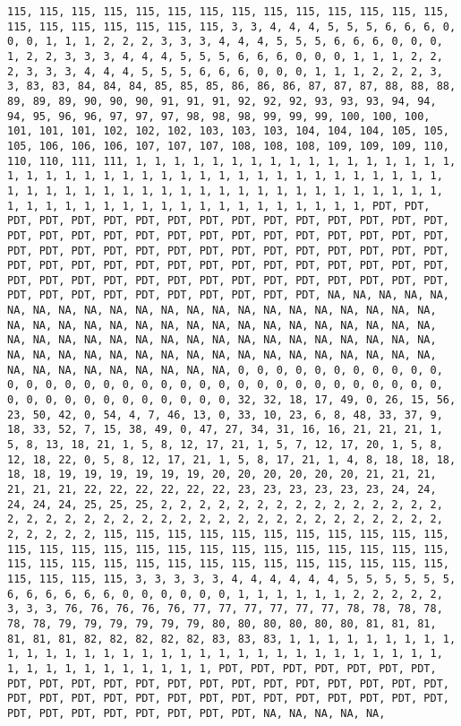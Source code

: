 \documentclass[]{article}
\begin{document}
\begin{verbatim}
115, 115, 115, 115, 115, 115, 115, 115, 115, 115, 115, 115, 115, 115, 115, 115, 115, 115, 115, 115, 115, 3, 3, 4, 4, 4, 5, 5, 5, 6, 6, 6, 0, 0, 0, 1, 1, 1, 2, 2, 2, 3, 3, 3, 4, 4, 4, 5, 5, 5, 6, 6, 6, 0, 0, 0, 1, 2, 2, 3, 3, 3, 4, 4, 4, 5, 5, 5, 6, 6, 6, 0, 0, 0, 1, 1, 1, 2, 2, 2, 3, 3, 3, 4, 4, 4, 5, 5, 5, 6, 6, 6, 0, 0, 0, 1, 1, 1, 2, 2, 2, 3, 3, 83, 83, 84, 84, 84, 85, 85, 85, 86, 86, 86, 87, 87, 87, 88, 88, 88, 89, 89, 89, 90, 90, 90, 91, 91, 91, 92, 92, 92, 93, 93, 93, 94, 94, 94, 95, 96, 96, 97, 97, 97, 98, 98, 98, 99, 99, 99, 100, 100, 100, 101, 101, 101, 102, 102, 102, 103, 103, 103, 104, 104, 104, 105, 105, 105, 106, 106, 106, 107, 107, 107, 108, 108, 108, 109, 109, 109, 110, 110, 110, 111, 111, 1, 1, 1, 1, 1, 1, 1, 1, 1, 1, 1, 1, 1, 1, 1, 1, 1, 1, 1, 1, 1, 1, 1, 1, 1, 1, 1, 1, 1, 1, 1, 1, 1, 1, 1, 1, 1, 1, 1, 1, 1, 1, 1, 1, 1, 1, 1, 1, 1, 1, 1, 1, 1, 1, 1, 1, 1, 1, 1, 1, 1, 1, 1, 1, 1, 1, 1, 1, 1, 1, 1, 1, 1, 1, 1, 1, 1, 1, 1, 1, 1, 1, PDT, PDT, PDT, PDT, PDT, PDT, PDT, PDT, PDT, PDT, PDT, PDT, PDT, PDT, PDT, PDT, PDT, PDT, PDT, PDT, PDT, PDT, PDT, PDT, PDT, PDT, PDT, PDT, PDT, PDT, PDT, PDT, PDT, PDT, PDT, PDT, PDT, PDT, PDT, PDT, PDT, PDT, PDT, PDT, PDT, PDT, PDT, PDT, PDT, PDT, PDT, PDT, PDT, PDT, PDT, PDT, PDT, PDT, PDT, PDT, PDT, PDT, PDT, PDT, PDT, PDT, PDT, PDT, PDT, PDT, PDT, PDT, PDT, PDT, PDT, PDT, PDT, PDT, PDT, PDT, PDT, PDT, NA, NA, NA, NA, NA, NA, NA, NA, NA, NA, NA, NA, NA, NA, NA, NA, NA, NA, NA, NA, NA, NA, NA, NA, NA, NA, NA, NA, NA, NA, NA, NA, NA, NA, NA, NA, NA, NA, NA, NA, NA, NA, NA, NA, NA, NA, NA, NA, NA, NA, NA, NA, NA, NA, NA, NA, NA, NA, NA, NA, NA, NA, NA, NA, NA, NA, NA, NA, NA, NA, NA, NA, NA, NA, NA, NA, NA, NA, NA, NA, NA, NA, 0, 0, 0, 0, 0, 0, 0, 0, 0, 0, 0, 0, 0, 0, 0, 0, 0, 0, 0, 0, 0, 0, 0, 0, 0, 0, 0, 0, 0, 0, 0, 0, 0, 0, 0, 0, 0, 0, 0, 0, 0, 0, 0, 0, 0, 0, 32, 32, 18, 17, 49, 0, 26, 15, 56, 23, 50, 42, 0, 54, 4, 7, 46, 13, 0, 33, 10, 23, 6, 8, 48, 33, 37, 9, 18, 33, 52, 7, 15, 38, 49, 0, 47, 27, 34, 31, 16, 16, 21, 21, 21, 1, 5, 8, 13, 18, 21, 1, 5, 8, 12, 17, 21, 1, 5, 7, 12, 17, 20, 1, 5, 8, 12, 18, 22, 0, 5, 8, 12, 17, 21, 1, 5, 8, 17, 21, 1, 4, 8, 18, 18, 18, 18, 18, 19, 19, 19, 19, 19, 19, 20, 20, 20, 20, 20, 20, 21, 21, 21, 21, 21, 21, 22, 22, 22, 22, 22, 22, 23, 23, 23, 23, 23, 23, 24, 24, 24, 24, 24, 25, 25, 25, 2, 2, 2, 2, 2, 2, 2, 2, 2, 2, 2, 2, 2, 2, 2, 2, 2, 2, 2, 2, 2, 2, 2, 2, 2, 2, 2, 2, 2, 2, 2, 2, 2, 2, 2, 2, 2, 2, 2, 2, 2, 2, 2, 115, 115, 115, 115, 115, 115, 115, 115, 115, 115, 115, 115, 115, 115, 115, 115, 115, 115, 115, 115, 115, 115, 115, 115, 115, 115, 115, 115, 115, 115, 115, 115, 115, 115, 115, 115, 115, 115, 115, 115, 115, 115, 115, 3, 3, 3, 3, 3, 4, 4, 4, 4, 4, 4, 5, 5, 5, 5, 5, 5, 6, 6, 6, 6, 6, 6, 0, 0, 0, 0, 0, 0, 1, 1, 1, 1, 1, 1, 2, 2, 2, 2, 2, 3, 3, 3, 76, 76, 76, 76, 76, 77, 77, 77, 77, 77, 77, 78, 78, 78, 78, 78, 78, 79, 79, 79, 79, 79, 79, 80, 80, 80, 80, 80, 80, 81, 81, 81, 81, 81, 81, 82, 82, 82, 82, 82, 83, 83, 83, 1, 1, 1, 1, 1, 1, 1, 1, 1, 1, 1, 1, 1, 1, 1, 1, 1, 1, 1, 1, 1, 1, 1, 1, 1, 1, 1, 1, 1, 1, 1, 1, 1, 1, 1, 1, 1, 1, 1, 1, 1, 1, 1, PDT, PDT, PDT, PDT, PDT, PDT, PDT, PDT, PDT, PDT, PDT, PDT, PDT, PDT, PDT, PDT, PDT, PDT, PDT, PDT, PDT, PDT, PDT, PDT, PDT, PDT, PDT, PDT, PDT, PDT, PDT, PDT, PDT, PDT, PDT, PDT, PDT, PDT, PDT, PDT, PDT, PDT, PDT, NA, NA, NA, NA, NA, 
\end{verbatim}
\end{document}
